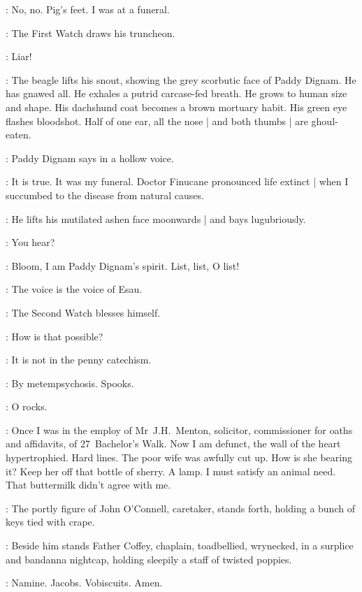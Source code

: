 \Bloom:
No,
no.
Pig's feet.
I was at a funeral.

:
The First Watch draws his truncheon.

\FirstWatch:
Liar!

:
The beagle lifts his snout,
showing the grey scorbutic face of Paddy Dignam.
He has gnawed all.
He exhales a putrid carcase-fed breath.
He grows to human size and shape.
His dachshund coat becomes a brown mortuary habit.
His green eye flashes bloodshot.
Half of one ear,
all the nose |
and both thumbs |
are ghoul-eaten.

:
Paddy Dignam says in a hollow voice.

\Dignam:
It is true.
It was my funeral.
Doctor Finucane pronounced life extinct |
when I succumbed to the disease from natural causes.

:
He lifts his mutilated ashen face moonwards |
and bays lugubriously.

\Bloom:
You hear?

\Dignam:
Bloom,
I am Paddy Dignam's spirit.
List,
list,
O list!

\Bloom:
The voice is the voice of Esau.

:
The Second Watch blesses himself.

\SecondWatch:
How is that possible?

\FirstWatch:
It is not in the penny catechism.

\Dignam:
By metempsychosis.
Spooks.

\Voice:
O rocks.

\Dignam:
Once I was in the employ of Mr~J.H.~Menton,
solicitor,
commissioner for oaths and affidavits,
of 27~Bachelor's Walk.
Now I am defunct,
the wall of the heart hypertrophied.
Hard lines.
The poor wife was awfully cut up.
How is she bearing it?
Keep her off that bottle of sherry.
A lamp.
I must satisfy an animal need.
That buttermilk didn't agree with me.

:
The portly figure of John O'Connell,
caretaker,
stands forth,
holding a bunch of keys tied with crape.

:
Beside him stands Father Coffey,
chaplain,
toadbellied,
wrynecked,
in a surplice and bandanna nightcap,
holding sleepily a staff of twisted poppies.

\FrCoffey:
Namine.
Jacobs.
Vobiscuits.
Amen.

